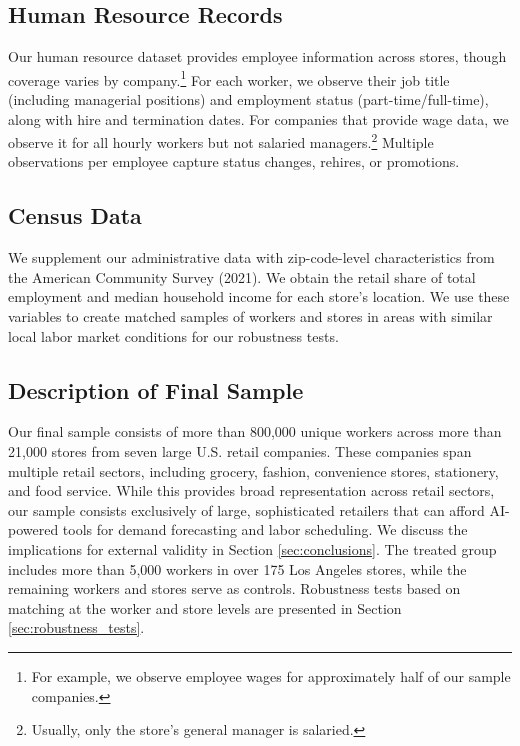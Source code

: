 \documentclass[letterpaper,11pt,leqno]{article}
\theoremstyle{paper}
\begin{document}
\subsection{Human Resource Records}

Our human resource dataset provides employee information across stores, though coverage varies by company.\footnote{For example, we observe employee wages for approximately half of our sample companies.} For each worker, we observe their job title (including managerial positions) and employment status (part-time/full-time), along with hire and termination dates. For companies that provide wage data, we observe it for all hourly workers but not salaried managers.\footnote{Usually, only the store's general manager is salaried.} Multiple observations per employee capture status changes, rehires, or promotions.

\subsection{Census Data}
We supplement our administrative data with zip-code-level characteristics from the American Community Survey (2021). We obtain the retail share of total employment and median household income for each store's location. We use these variables to create matched samples of workers and stores in areas with similar local labor market conditions for our robustness tests. 



\subsection{Description of Final Sample} \label{subsec:summ_stats}

Our final sample consists of more than 800,000 unique workers across more than 21,000 stores from seven large U.S. retail companies. These companies span multiple retail sectors, including grocery, fashion, convenience stores, stationery, and food service. While this provides broad representation across retail sectors, our sample consists exclusively of large, sophisticated retailers that can afford AI-powered tools for demand forecasting and labor scheduling. We discuss the implications for external validity in Section \ref{sec:conclusions}. The treated group includes more than 5,000 workers in over 175 Los Angeles stores, while the remaining workers and stores serve as controls. Robustness tests based on matching at the worker and store levels are presented in Section \ref{sec:robustness_tests}.
\end{document}

